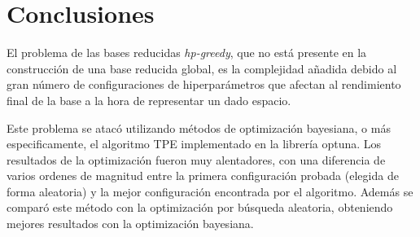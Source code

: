 \chapter{Conclusiones}













El problema de las bases reducidas \textit{hp-greedy}, que no está presente en la construcción de una base reducida global, es la complejidad añadida debido al gran número de configuraciones de hiperparámetros que afectan al rendimiento final de la base a la hora de representar un dado espacio. 

Este problema se atacó utilizando métodos de optimización bayesiana, o más especificamente, el algoritmo TPE implementado en la librería optuna. Los resultados de la optimización fueron muy alentadores, con una diferencia de varios ordenes de magnitud entre la primera configuración probada (elegida de forma aleatoria) y la mejor configuración encontrada por el algoritmo. Además se comparó este método con la optimización por búsqueda aleatoria, obteniendo mejores resultados con la optimización bayesiana.


